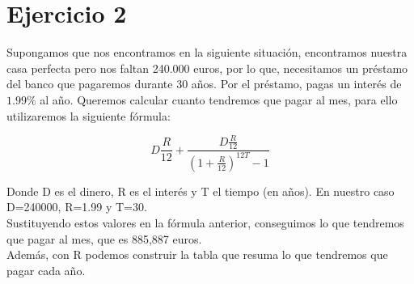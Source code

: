 \documentclass[a4paper,]{article}
\begin{document}
\newpage
\section*{Ejercicio 2}
Supongamos que nos encontramos en la siguiente situación, encontramos nuestra casa perfecta pero nos faltan 240.000 euros, por lo que, necesitamos un préstamo del banco que pagaremos durante 30 años. Por el préstamo, pagas un interés de $1.99\%$ al año. Queremos calcular cuanto tendremos que pagar al mes, para ello utilizaremos la siguiente fórmula:

$$D\frac{R}{12}+\frac{D\frac{R}{12}}{(1+\frac{R}{12})^{12T}-1}$$

Donde D es el dinero, R es el interés y T el tiempo (en años). En nuestro caso D=240000, R=1.99 y T=30. \\

Sustituyendo estos valores en la fórmula anterior, conseguimos lo que tendremos que pagar al mes, que es 885,887 euros.\\

Además, con R podemos construir la tabla que resuma lo que tendremos que pagar cada año.\\
\end{document}
